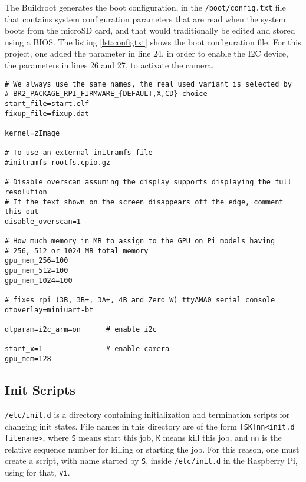 The Buildroot generates the boot configuration, in the \verb|/boot/config.txt| file that contains system configuration parameters that are read when the system boots from the microSD card, and that would traditionally be edited and stored using a BIOS. \cite{configtxt} The listing \ref{lst:configtxt} shows the boot configuration file. For this project, one added the parameter in line 24, in order to enable the I2C device, the parameters in lines 26 and 27, to activate the camera.

\begin{lstlisting}[caption={/boot/config.txt file.}, label={lst:configtxt}]
# We always use the same names, the real used variant is selected by
# BR2_PACKAGE_RPI_FIRMWARE_{DEFAULT,X,CD} choice
start_file=start.elf
fixup_file=fixup.dat

kernel=zImage

# To use an external initramfs file
#initramfs rootfs.cpio.gz

# Disable overscan assuming the display supports displaying the full resolution
# If the text shown on the screen disappears off the edge, comment this out
disable_overscan=1

# How much memory in MB to assign to the GPU on Pi models having
# 256, 512 or 1024 MB total memory
gpu_mem_256=100
gpu_mem_512=100
gpu_mem_1024=100

# fixes rpi (3B, 3B+, 3A+, 4B and Zero W) ttyAMA0 serial console
dtoverlay=miniuart-bt

dtparam=i2c_arm=on 		# enable i2c

start_x=1             	# enable camera
gpu_mem=128           
\end{lstlisting}

\subsection{Init Scripts}
\verb|/etc/init.d| is a directory containing initialization and termination scripts for changing init states. File names in this directory are of the form \linebreak \verb|[SK]nn<init.d filename>|, where \verb|S| means start this job, \verb|K| means kill this job, and \verb|nn| is the relative sequence number for killing or starting the job. \cite{initScript} For this reason, one must create a script, with name started by \verb|S|, inside \verb|/etc/init.d| in the Raspberry Pi, using for that, \verb|vi|.

